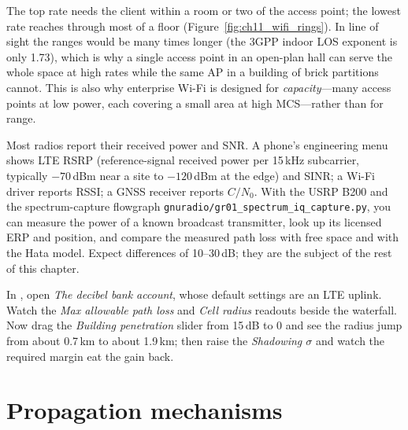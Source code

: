 
The top rate needs the client within a room or two of the access point; the lowest rate reaches
through most of a floor (Figure~\ref{fig:ch11_wifi_rings}). In line of sight the ranges would be
many times longer (the 3GPP indoor LOS exponent is only 1.73), which is why a single access point
in an open-plan hall can serve the whole space at high rates while the same AP in a building of
brick partitions cannot. This is also why enterprise Wi-Fi is designed for \emph{capacity}---many
access points at low power, each covering a small area at high MCS---rather than for range.

\begin{inpractice}
Most radios report their received power and SNR. A phone's engineering menu shows LTE RSRP
(reference-signal received power per 15\,kHz subcarrier, typically $-70$\,dBm near a site to
$-120$\,dBm at the edge) and SINR; a Wi-Fi driver reports RSSI; a GNSS receiver reports
$C/N_0$. With the USRP B200 and the spectrum-capture flowgraph
\texttt{gnuradio/gr01\_spectrum\_iq\_capture.py}, you can measure the power of a known
broadcast transmitter, look up its licensed ERP and position, and compare the measured path
loss with free space and with the Hata model. Expect differences of 10--30\,dB; they are the
subject of the rest of this chapter.
\end{inpractice}

\begin{tryit}
In , open \emph{The decibel bank account}, whose default settings
are an LTE uplink. Watch the \emph{Max allowable path loss} and \emph{Cell radius} readouts beside the
waterfall. Now drag the \emph{Building penetration} slider from 15\,dB to 0 and see the radius jump
from about 0.7\,km to about 1.9\,km; then raise the \emph{Shadowing $\sigma$} and watch the required
margin eat the gain back.
\end{tryit}

\section{Propagation mechanisms}
\label{sec:ch11:mechanisms}

